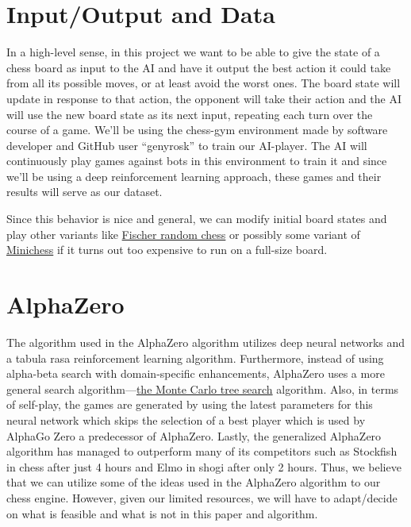 \documentclass[notitlepage, 12pt]{article}
\begin{document}
\section*{Input/Output and Data}
In a high-level sense, in this project we want to be able to give the state of a chess board as input to the AI and have it output the best action it could take from all its possible moves, or at least avoid the worst ones. The board state will update in response to that action, the opponent will take their action and the AI will use the new board state as its next input, repeating each turn over the course of a game. We’ll be using the chess-gym environment made by software developer and GitHub user “genyrosk” to train our AI-player. The AI will continuously play games against bots in this environment to train it and since we’ll be using a deep reinforcement learning approach, these games and their results will serve as our dataset.

Since this behavior is nice and general, we can modify initial board states and play other variants like \href{https://en.wikipedia.org/wiki/Fischer_random_chess}{Fischer random chess} or possibly some variant of \href{https://en.wikipedia.org/wiki/Minichess}{Minichess} if it turns out too expensive to run on a full-size board.

\section*{AlphaZero}
The algorithm used in the AlphaZero algorithm utilizes deep neural networks and a tabula rasa reinforcement learning algorithm. Furthermore, instead of using alpha-beta search with domain-specific enhancements, AlphaZero uses a more general search algorithm—\href{https://en.wikipedia.org/wiki/Monte_Carlo_tree_search}{the Monte Carlo tree search} algorithm. Also, in terms of self-play, the games are generated by using the latest parameters for this neural network which skips the selection of a best player which is used by AlphaGo Zero a predecessor of AlphaZero. Lastly, the generalized AlphaZero algorithm has managed to outperform many of its competitors such as Stockfish in chess after just 4 hours and Elmo in shogi after only 2 hours. Thus, we believe that we can utilize some of the ideas used in the AlphaZero algorithm to our chess engine. However, given our limited resources, we will have to adapt/decide on what is feasible and what is not in this paper and algorithm.


\end{document}
